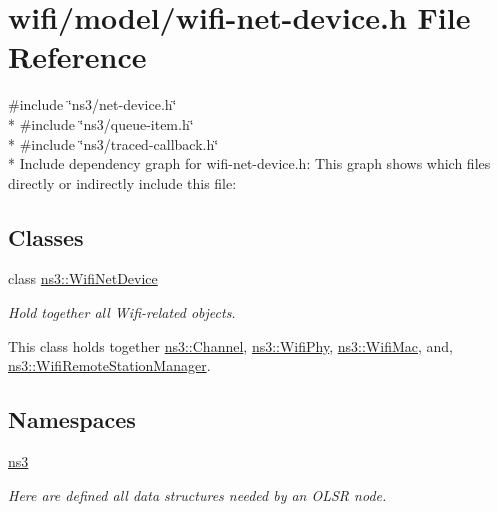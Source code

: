 \hypertarget{wifi-net-device_8h}{}\section{wifi/model/wifi-\/net-\/device.h File Reference}
\label{wifi-net-device_8h}
{\ttfamily \#include \char`\"{}ns3/net-\/device.\+h\char`\"{}}\\*
{\ttfamily \#include \char`\"{}ns3/queue-\/item.\+h\char`\"{}}\\*
{\ttfamily \#include \char`\"{}ns3/traced-\/callback.\+h\char`\"{}}\\*
Include dependency graph for wifi-\/net-\/device.h\+:
This graph shows which files directly or indirectly include this file\+:
\subsection*{Classes}
\begin{DoxyCompactItemize}
\item 
class \hyperlink{classns3_1_1WifiNetDevice}{ns3\+::\+Wifi\+Net\+Device}
\begin{DoxyCompactList}\small\item\em Hold together all Wifi-\/related objects.

This class holds together \hyperlink{classns3_1_1Channel}{ns3\+::\+Channel}, \hyperlink{classns3_1_1WifiPhy}{ns3\+::\+Wifi\+Phy}, \hyperlink{classns3_1_1WifiMac}{ns3\+::\+Wifi\+Mac}, and, \hyperlink{classns3_1_1WifiRemoteStationManager}{ns3\+::\+Wifi\+Remote\+Station\+Manager}. \end{DoxyCompactList}\end{DoxyCompactItemize}
\subsection*{Namespaces}
\begin{DoxyCompactItemize}
\item 
 \hyperlink{namespacens3}{ns3}
\begin{DoxyCompactList}\small\item\em Here are defined all data structures needed by an O\+L\+SR node. \end{DoxyCompactList}\end{DoxyCompactItemize}
